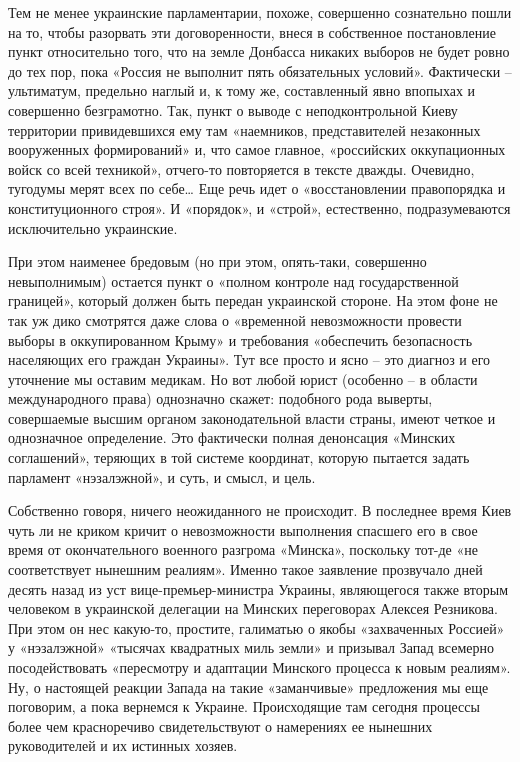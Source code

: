 Тем не менее украинские парламентарии, похоже, совершенно сознательно пошли на
то, чтобы разорвать эти договоренности, внеся в собственное постановление пункт
относительно того, что на земле Донбасса никаких выборов не будет ровно до тех
пор, пока «Россия не выполнит пять обязательных условий». Фактически –
ультиматум, предельно наглый и, к тому же, составленный явно впопыхах и
совершенно безграмотно. Так, пункт о выводе с неподконтрольной Киеву территории
привидевшихся ему там «наемников, представителей незаконных вооруженных
формирований» и, что самое главное, «российских оккупационных войск со всей
техникой», отчего-то повторяется в тексте дважды. Очевидно, тугодумы мерят всех
по себе… Еще речь идет о «восстановлении правопорядка и конституционного
строя». И «порядок», и «строй», естественно, подразумеваются исключительно
украинские.

При этом наименее бредовым (но при этом, опять-таки, совершенно невыполнимым) остается пункт о «полном контроле над государственной границей», который должен быть передан украинской стороне. На этом фоне не так уж дико смотрятся даже слова о «временной невозможности провести выборы в оккупированном Крыму» и требования «обеспечить безопасность населяющих его граждан Украины». Тут все просто и ясно – это диагноз и его уточнение мы оставим медикам. Но вот любой юрист (особенно – в области международного права) однозначно скажет: подобного рода выверты, совершаемые высшим органом законодательной власти страны, имеют четкое и однозначное определение. Это фактически полная денонсация «Минских соглашений», теряющих в той системе координат, которую пытается задать парламент «нэзалэжной», и суть, и смысл, и цель.

Собственно говоря, ничего неожиданного не происходит. В последнее время Киев чуть ли не криком кричит о невозможности выполнения спасшего его в свое время от окончательного военного разгрома «Минска», поскольку тот-де «не соответствует нынешним реалиям». Именно такое заявление прозвучало дней десять назад из уст вице-премьер-министра Украины, являющегося также вторым человеком в украинской делегации на Минских переговорах Алексея Резникова. При этом он нес какую-то, простите, галиматью о якобы «захваченных Россией» у «нэзалэжной» «тысячах квадратных миль земли» и призывал Запад всемерно посодействовать «пересмотру и адаптации Минского процесса к новым реалиям». Ну, о настоящей реакции Запада на такие «заманчивые» предложения мы еще поговорим, а пока вернемся к Украине. Происходящие там сегодня процессы более чем красноречиво свидетельствуют о намерениях ее нынешних руководителей и их истинных хозяев.

